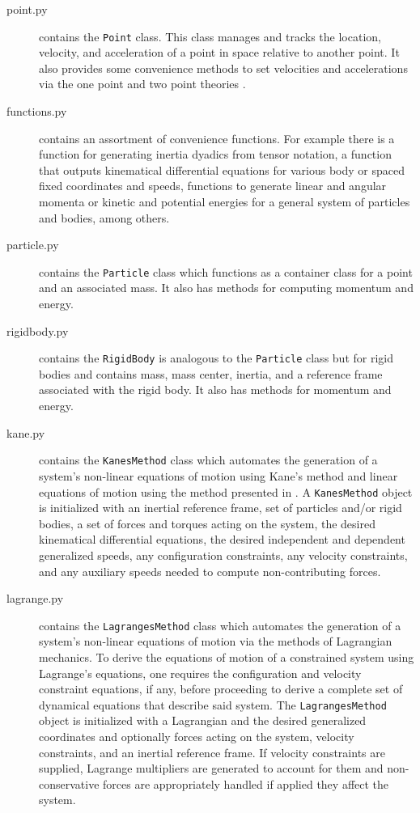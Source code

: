 \documentclass[twocolumn,10pt]{asme2e}
\begin{document}
\begin{description}
\begin{description}
    \end{description}
  \item[point.py] contains the \verb|Point| class. This class manages
    and tracks the location, velocity, and acceleration of a point in space
    relative to another point. It also provides some convenience methods to set
    velocities and accelerations via the one point and two point theories
    \cite{Kane1985}.
  \item[functions.py] contains an assortment of convenience functions. For
    example there is a function for generating inertia dyadics from tensor
    notation, a function that outputs kinematical differential equations for
    various body or spaced fixed coordinates and speeds, functions to generate
    linear and angular momenta or kinetic and potential energies for a general
    system of particles and bodies, among others.
  \item[particle.py] contains the \verb|Particle| class which functions as a
    container class for a point and an associated mass. It also has methods for
    computing momentum and energy.
  \item[rigidbody.py] contains the \verb|RigidBody| is analogous to the
    \verb|Particle| class but for rigid bodies and contains mass, mass center,
    inertia, and a reference frame associated with the rigid body. It also has
    methods for momentum and energy.
  \item[kane.py] contains the \verb|KanesMethod| class which automates the
    generation of a system's non-linear equations of motion using Kane's
    method\cite{Kane1985} and linear equations of motion using the method
    presented in \cite{Peterson2013}. A \verb|KanesMethod| object is initialized
    with an inertial reference frame, set of particles and/or rigid bodies, a
    set of forces and torques acting on the system, the desired kinematical
    differential equations, the desired independent and dependent generalized
    speeds, any configuration constraints, any velocity constraints, and any
    auxiliary speeds needed to compute non-contributing forces.
  \item[lagrange.py] contains the \verb|LagrangesMethod| class which automates
    the generation of a system's non-linear equations of motion via the methods
    of Lagrangian mechanics\cite{Crandall1968}. To derive the equations of
    motion of a constrained system using Lagrange's equations, one requires the
    configuration and velocity constraint equations, if any, before proceeding
    to derive a complete set of dynamical equations that describe said system.
    The \verb|LagrangesMethod| object is initialized with a Lagrangian and the
    desired generalized coordinates and optionally forces acting on the system,
    velocity constraints, and an inertial reference frame. If velocity
    constraints are supplied, Lagrange multipliers are generated to account for
    them and non-conservative forces are appropriately handled if applied they
    affect the system.
\end{description}
\end{document}
